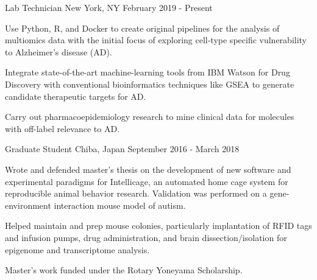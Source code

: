 %
%
%

\vspace*{0.35cm}

\begin{cventries}

    {Lab Technician}
    {New York, NY}
    {February 2019 - Present}
    {\begin{cvitems}
        \item{Use Python, R, and Docker to create original pipelines for the analysis of multiomics data with the initial focus of exploring cell-type specific vulnerability to Alzheimer's disease (AD).\vspace*{0.1cm}}
        \item{Integrate state-of-the-art machine-learning tools from IBM Watson for Drug Discovery with conventional bioinformatics techniques like GSEA to generate candidate therapeutic targets for AD.\vspace*{0.1cm}}
        \item{Carry out pharmacoepidemiology research to mine clinical data for molecules with off-label relevance to AD.}
    \end{cvitems}}
    \vspace*{0.2cm}

    {Graduate Student}
    {Chiba, Japan}
    {September 2016 - March 2018}
    {\begin{cvitems}
        \item{Wrote and defended master's thesis on the development of new software and experimental paradigms for Intellicage, an automated home cage system for reproducible animal behavior research. Validation was performed on a gene-environment interaction mouse model of autism.\vspace*{0.1cm}}
        \item{Helped maintain and prep mouse colonies, particularly implantation of RFID tags and infusion pumps, drug administration, and brain dissection/isolation for epigenome and transcriptome analysis.\vspace*{0.1cm}}
        \item{Master's work funded under the Rotary Yoneyama Scholarship.}
    \end{cvitems}}
    \vspace*{0.2cm}
    

\end{cventries}
